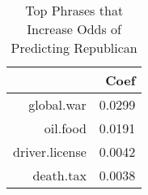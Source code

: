 \begin{table}[ht]
\centering
\begin{tabular}{rr}
  \hline
 & Coef \\ 
  \hline
global.war & 0.0299 \\ 
  oil.food & 0.0191 \\ 
  driver.license & 0.0042 \\ 
  death.tax & 0.0038 \\ 
   \hline
\end{tabular}
\caption{Top Phrases that Increase Odds of Predicting Republican} 
\label{tab:repx_coef_p}
\end{table}
